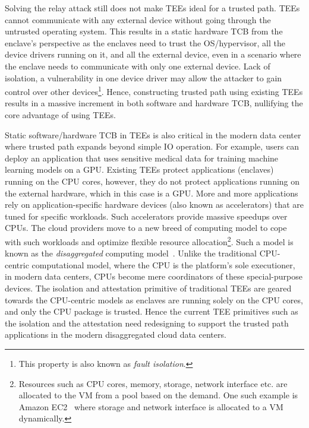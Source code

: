  Solving the relay attack still does not make TEEs ideal for a trusted path. TEEs cannot communicate with any external device without going through the untrusted operating system. This results in a static hardware TCB from the enclave's perspective as the enclaves need to trust the OS/hypervisor, all the device drivers running on it, and all the external device, even in a scenario where the enclave needs to communicate with only one external device. Lack of isolation, a vulnerability in one device driver may allow the attacker to gain control over other devices\footnote{This property is also known as \emph{fault isolation}.}. Hence, constructing trusted path using existing TEEs results in a massive increment in both software and hardware TCB, nullifying the core advantage of using TEEs.


 Static software/hardware TCB in TEEs is also critical in the modern data center where trusted path expands beyond simple IO operation. For example, users can deploy an application that uses sensitive medical data for training machine learning models on a GPU. Existing TEEs protect applications (enclaves) running on the CPU cores, however, they do not protect applications running on the external hardware, which in this case is a GPU. More and more applications rely on application-specific hardware devices (also known as accelerators) that are tuned for specific workloads. Such accelerators provide massive speedups over CPUs. The cloud providers move to a new breed of computing model to cope with such workloads and optimize flexible resource allocation\footnote{Resources such as CPU cores, memory, storage, network interface etc. are allocated to the VM from a pool based on the demand. One such example is Amazon EC2~\cite{ec2} where storage and network interface is allocated to a VM dynamically.}. Such a model is known as the \emph{disaggregated} computing model~\cite{disaggregatedcomp}. Unlike the traditional CPU-centric computational model, where the CPU is the platform's sole executioner, in modern data centers, CPUs become mere coordinators of these special-purpose devices. The isolation and attestation primitive of traditional TEEs are geared towards the CPU-centric models as enclaves are running solely on the CPU cores, and only the CPU package is trusted. Hence the current TEE primitives such as the isolation and the attestation need redesigning to support the trusted path applications in the modern disaggregated cloud data centers.